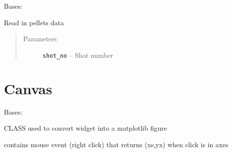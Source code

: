\documentclass[letterpaper,10pt,english]{sphinxmanual}
\begin{document}
\begin{fulllineitems}
\label{pellet_data:pellet_data.PelletData}
Bases: 

\begin{fulllineitems}
\label{pellet_data:pellet_data.PelletData.PELLET_THRESHOLD}
\end{fulllineitems}


\begin{fulllineitems}
\label{pellet_data:pellet_data.PelletData.read_data}
Read in pellets data
\begin{quote}\begin{description}
\item[{Parameters}] \leavevmode
\textbf{\texttt{shot\_no}} -- Shot number

\end{description}\end{quote}

\end{fulllineitems}


\end{fulllineitems}



\section{Canvas}
\label{canvas:module-canvas}\label{canvas:canvas}\label{canvas::doc}

\begin{fulllineitems}
\label{canvas:canvas.Canvas}
Bases: 

CLASS used to convert widget into a matplotlib figure

contains mouse event (right click) that returns (xs,yx) when click is in axes

\begin{fulllineitems}
\label{canvas:canvas.Canvas.signal}
\end{fulllineitems}


\end{fulllineitems}
\end{document}
